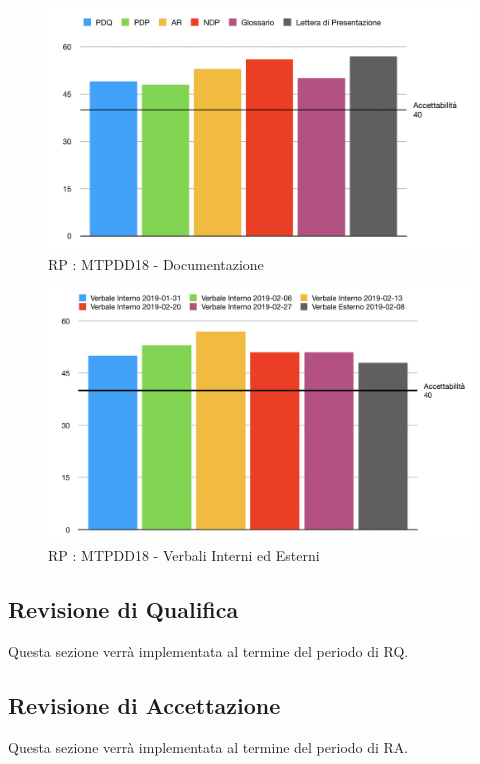 \begin{figure}[H]
	\begin{center}
		\includegraphics[scale=0.6]{./images/grafici_RP/gulpeasedocumenti.png} 
	\end{center}
	\caption{RP : MTPDD18 - Documentazione}
\end{figure}

\begin{figure}[H]
	\begin{center}
		\includegraphics[scale=0.5]{./images/grafici_RP/gulpeaseverbali.png} 
	\end{center}
	\caption{RP : MTPDD18 - Verbali Interni ed Esterni}
\end{figure}


\newpage
\subsection{Revisione di Qualifica}

Questa sezione verrà implementata al termine del periodo di RQ.

\subsection{Revisione di Accettazione}

Questa sezione verrà implementata al termine del periodo di RA.

